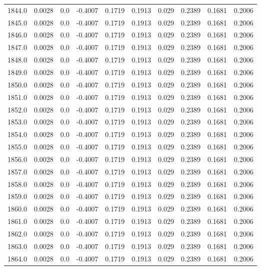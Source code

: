 \begin{longtable}{lrrrrrrrrr}
1844.0 & 0.0028 & 0.0 & -0.4007 & 0.1719 & 0.1913 & 0.029 & 0.2389 & 0.1681 & 0.2006 \\
1845.0 & 0.0028 & 0.0 & -0.4007 & 0.1719 & 0.1913 & 0.029 & 0.2389 & 0.1681 & 0.2006 \\
1846.0 & 0.0028 & 0.0 & -0.4007 & 0.1719 & 0.1913 & 0.029 & 0.2389 & 0.1681 & 0.2006 \\
1847.0 & 0.0028 & 0.0 & -0.4007 & 0.1719 & 0.1913 & 0.029 & 0.2389 & 0.1681 & 0.2006 \\
1848.0 & 0.0028 & 0.0 & -0.4007 & 0.1719 & 0.1913 & 0.029 & 0.2389 & 0.1681 & 0.2006 \\
1849.0 & 0.0028 & 0.0 & -0.4007 & 0.1719 & 0.1913 & 0.029 & 0.2389 & 0.1681 & 0.2006 \\
1850.0 & 0.0028 & 0.0 & -0.4007 & 0.1719 & 0.1913 & 0.029 & 0.2389 & 0.1681 & 0.2006 \\
1851.0 & 0.0028 & 0.0 & -0.4007 & 0.1719 & 0.1913 & 0.029 & 0.2389 & 0.1681 & 0.2006 \\
1852.0 & 0.0028 & 0.0 & -0.4007 & 0.1719 & 0.1913 & 0.029 & 0.2389 & 0.1681 & 0.2006 \\
1853.0 & 0.0028 & 0.0 & -0.4007 & 0.1719 & 0.1913 & 0.029 & 0.2389 & 0.1681 & 0.2006 \\
1854.0 & 0.0028 & 0.0 & -0.4007 & 0.1719 & 0.1913 & 0.029 & 0.2389 & 0.1681 & 0.2006 \\
1855.0 & 0.0028 & 0.0 & -0.4007 & 0.1719 & 0.1913 & 0.029 & 0.2389 & 0.1681 & 0.2006 \\
1856.0 & 0.0028 & 0.0 & -0.4007 & 0.1719 & 0.1913 & 0.029 & 0.2389 & 0.1681 & 0.2006 \\
1857.0 & 0.0028 & 0.0 & -0.4007 & 0.1719 & 0.1913 & 0.029 & 0.2389 & 0.1681 & 0.2006 \\
1858.0 & 0.0028 & 0.0 & -0.4007 & 0.1719 & 0.1913 & 0.029 & 0.2389 & 0.1681 & 0.2006 \\
1859.0 & 0.0028 & 0.0 & -0.4007 & 0.1719 & 0.1913 & 0.029 & 0.2389 & 0.1681 & 0.2006 \\
1860.0 & 0.0028 & 0.0 & -0.4007 & 0.1719 & 0.1913 & 0.029 & 0.2389 & 0.1681 & 0.2006 \\
1861.0 & 0.0028 & 0.0 & -0.4007 & 0.1719 & 0.1913 & 0.029 & 0.2389 & 0.1681 & 0.2006 \\
1862.0 & 0.0028 & 0.0 & -0.4007 & 0.1719 & 0.1913 & 0.029 & 0.2389 & 0.1681 & 0.2006 \\
1863.0 & 0.0028 & 0.0 & -0.4007 & 0.1719 & 0.1913 & 0.029 & 0.2389 & 0.1681 & 0.2006 \\
1864.0 & 0.0028 & 0.0 & -0.4007 & 0.1719 & 0.1913 & 0.029 & 0.2389 & 0.1681 & 0.2006 \\

\end{longtable}
